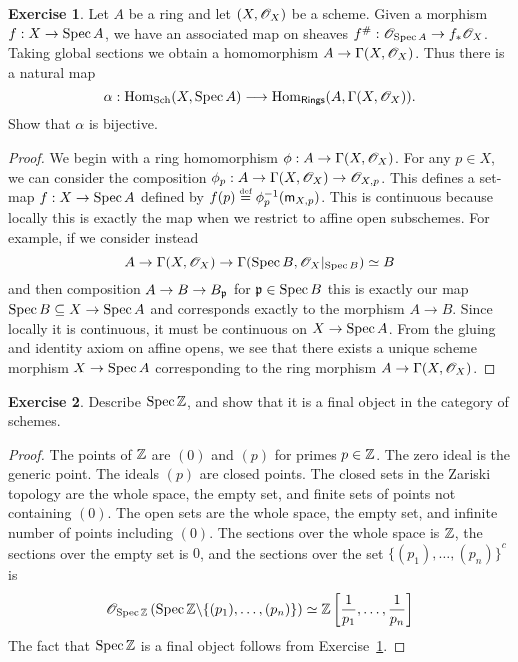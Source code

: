 \documentclass[]{pcmi}
\theoremstyle{plain}
\theoremstyle{definition}
\newtheorem{Exercise}{Exercise}
\theoremstyle{remark}
\begin{document}
\begin{Exercise}\label{Exercise:2.2.4}
    Let $A$ be a ring and let $(X, \mathscr{O}_X)$ be a scheme. Given a morphism $f : X \to \operatorname{Spec} A$, we have an associated map on sheaves $f^\# : \mathscr{O}_{\operatorname{Spec} A} \to f_* \mathscr{O}_X$. Taking global sections we obtain a homomorphism $A \to \Gamma(X, \mathscr{O}_X)$. Thus there is a natural map 
    \[
        \alpha : \operatorname{Hom}_{\operatorname{Sch}}(X, \operatorname{Spec} A) \longrightarrow \operatorname{Hom}_{\mathsf{Rings}}(A, \Gamma(X, \mathscr{O}_X)).
    \]
    Show that $\alpha$ is bijective. 
\end{Exercise}

\begin{proof}
    We begin with a ring homomorphism $\phi : A \to \Gamma(X, \mathscr{O}_X)$. For any $p \in X$, we can consider the composition $\phi_p : A \to \Gamma(X, \mathscr{O}_X) \to \mathscr{O}_{X, p}$. This defines a set-map $f : X \to \operatorname{Spec} A$ defined by $f(p) \overset{\textup{\tiny def}}= \phi_p^{-1}(\mathsf{m}_{X, p})$. This is continuous because locally this is exactly the map when we restrict to affine open subschemes. For example, if we consider instead 
    \[
        A \to \Gamma(X, \mathscr{O}_X) \to \Gamma(\operatorname{Spec} B, \mathscr{O}_X|_{\operatorname{Spec} B}) \simeq B
    \]
    and then composition $A \to B \to B_{\mathfrak{p}}$ for $\mathfrak{p} \in \operatorname{Spec} B$ this is exactly our map $\operatorname{Spec} B \subseteq X \to \operatorname{Spec} A$ and corresponds exactly to the morphism $A \to B$. Since locally it is continuous, it must be continuous on $X \to \operatorname{Spec} A$. From the gluing and identity axiom on affine opens, we see that there exists a unique scheme morphism $X \to \operatorname{Spec} A$ corresponding to the ring morphism $A \to \Gamma(X, \mathscr{O}_X)$. 
\end{proof}

\begin{Exercise}
    Describe $\operatorname{Spec} \mathbb{Z}$, and show that it is a final object in the category of schemes. 
\end{Exercise}

\begin{proof}
    The points of $\mathbb{Z}$ are $(0)$ and $(p)$ for primes $p \in \mathbb{Z}$. The zero ideal is the generic point. The ideals $(p)$ are closed points. The closed sets in the Zariski topology are the whole space, the empty set, and finite sets of points not containing $(0)$. The open sets are the whole space, the empty set, and infinite number of points including $(0)$. The sections over the whole space is $\mathbb{Z}$, the sections over the empty set is $0$, and the sections over the set ${\{(p_1), \ldots, (p_n)\}}^c$ is 
    \[
        \mathscr{O}_{\operatorname{Spec} \mathbb{Z}} \left( \operatorname{Spec} \mathbb{Z} \backslash \{(p_1), \ldots, (p_n) \} \right) \simeq \mathbb{Z} \left[ \frac{1}{p_1}, \ldots, \frac{1}{p_n} \right]
    \]
    The fact that $\operatorname{Spec} \mathbb{Z}$ is a final object follows from Exercise~\ref{Exercise:2.2.4}. 
\end{proof}
\end{document}
